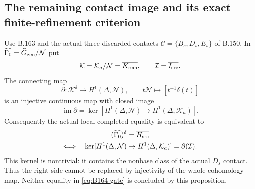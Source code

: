 \subsection*{The remaining contact image and its exact finite-refinement criterion}
\label{stmt:B164}
Use B.163 and the actual three discarded contacts
$\mathscr C=\{B_s,D_s,E_s\}$ of B.150. In
$\widehat{\Gamma_0}=\widehat G_{\rm gen}/\mathcal N$ put
\[
 \mathcal K=\mathcal K_a/\mathcal N=\overline{K_{\rm rem}},\qquad
 \mathcal I=\overline{I_{\rm src}}.
\]
The connecting map
\begin{equation}\label{eq:B164-connecting}
 \partial:\mathcal K^\delta\longrightarrow H^1(\Delta,\mathcal N),
 \qquad t\mathcal N\longmapsto[t^{-1}\delta(t)]
\end{equation}
is an injective continuous map with closed image
\[
 \operatorname{im}\partial
   =\ker[H^1(\Delta,\mathcal N)\to H^1(\Delta,\mathcal K_a)].
\]
Consequently the actual local completed equality is equivalent to
\begin{equation}\label{eq:B164-gate}
 \begin{gathered}
 (\widehat{\Gamma_0})^\delta=\overline{H_{\rm src}}\\
 \Longleftrightarrow\quad
 \ker[H^1(\Delta,\mathcal N)\to H^1(\Delta,\mathcal K_a)]
          =\partial(\mathcal I).
 \end{gathered}
\end{equation}
This kernel is nontrivial: it contains the nonbase class of the actual
$D_s$ contact. Thus the right side cannot be replaced by injectivity
of the whole cohomology map. Neither equality in
\eqref{eq:B164-gate} is concluded by this proposition.
